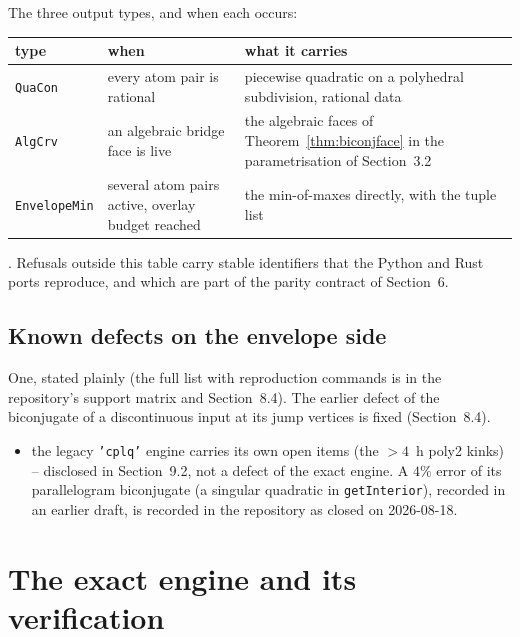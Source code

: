 \documentclass[11pt]{article}
\theoremstyle{definition}
\begin{document}
The three output types, and when each occurs:
\begin{center}
\begin{tabular}{p{2.9cm}p{4.6cm}p{7.4cm}}
\toprule
type & when & what it carries \\
\midrule
\texttt{QuaCon} & every atom pair is rational & piecewise quadratic on a
polyhedral subdivision, rational data \\
\texttt{AlgCrv} & an algebraic bridge face is live & the algebraic faces of
Theorem~\ref{thm:biconjface} in the parametrisation of Section~3.2 \\
\texttt{EnvelopeMin} & several atom pairs active, overlay budget reached & the
min-of-maxes directly, with the tuple list \\
\bottomrule
\end{tabular}
\end{center}
\noindent.
 Refusals outside
this table carry stable identifiers that the Python and Rust ports reproduce,
and which are part of the parity contract of Section~6.

\subsection{Known defects on the envelope side}

One, stated plainly (the full list with reproduction commands is in the
repository's support matrix and Section~8.4). The earlier defect of the
biconjugate of a discontinuous input at its jump vertices is fixed
(Section~8.4).
\begin{itemize}[nosep,leftmargin=*]
\item the legacy \texttt{'cplq'} engine carries its own open items (the
  $>4$~h poly2 kinks) -- disclosed in Section~9.2, not a defect of the
  exact engine. A $4\%$ error of its parallelogram biconjugate (a singular
  quadratic in \texttt{getInterior}), recorded in an earlier draft, is recorded
  in the repository as closed on 2026-08-18.
\end{itemize}

\section{The exact engine and its verification}
\end{document}
